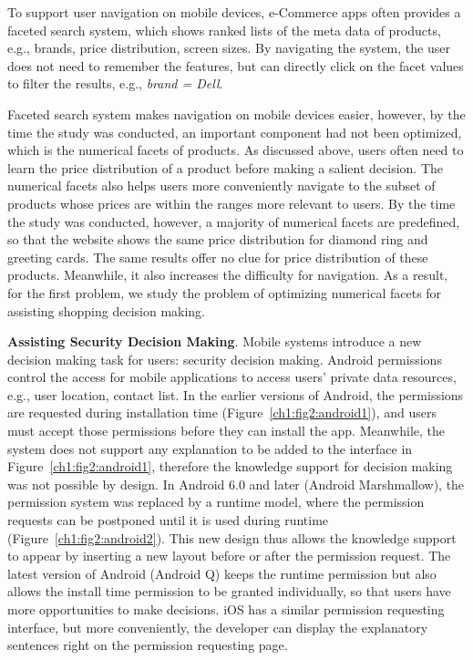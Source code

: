 To support user navigation on mobile devices, e-Commerce apps often provides a faceted search system, which shows ranked lists of the meta data of products, e.g., brands, price distribution, screen sizes. By navigating the system, the user does not need to remember the features, but can directly click on the facet values to filter the results, e.g., \emph{brand = Dell}. 

Faceted search system makes navigation on mobile devices easier, however, by the time the study was conducted, an important component had not been optimized, which is the numerical facets of products. As discussed above, users often need to learn the price distribution of a product before making a salient decision. The numerical facets also helps users more conveniently navigate to the subset of products whose prices are within the ranges more relevant to users. By the time the study was conducted, however, a majority of numerical facets are predefined, so that the website shows the same price distribution for diamond ring and greeting cards. The same results offer no clue for price distribution of these products. Meanwhile, it also increases the difficulty for navigation. As a result, for the first problem, we study the problem of optimizing numerical facets for assisting shopping decision making. 

\textbf{Assisting Security Decision Making}. Mobile systems introduce a new decision making task for users: security decision making. Android permissions control the access for mobile applications to access users' private data resources, e.g., user location, contact list. In the earlier versions of Android, the permissions are requested during installation time (Figure~\ref{ch1:fig2:android1}), and users must accept those permissions before they can install the app. Meanwhile, the system does not support any explanation to be added to the interface in Figure~\ref{ch1:fig2:android1}, therefore the knowledge support for decision making was not possible by design. In Android 6.0 and later (Android Marshmallow), the permission system was replaced by a runtime model, where the permission requests can be postponed until it is used during runtime (Figure~\ref{ch1:fig2:android2}). This new design thus allows the knowledge support to appear by inserting a new layout before or after the permission request. The latest version of Android (Android Q) keeps the runtime permission but also allows the install time permission to be granted individually, so that users have more opportunities to make decisions. iOS has a similar permission requesting interface, but more conveniently, the developer can display the explanatory sentences right on the permission requesting page. 


